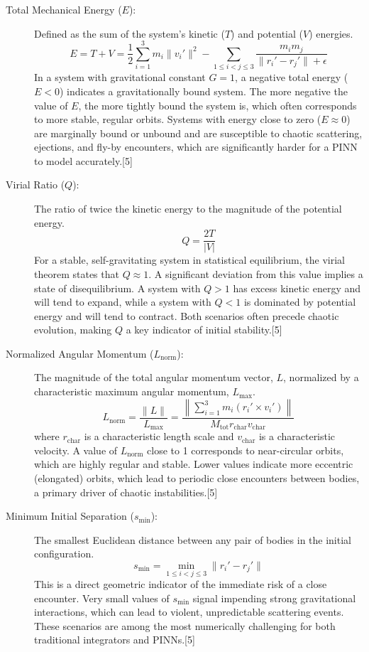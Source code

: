 \begin{description}
    \item[Total Mechanical Energy ($E$):] Defined as the sum of the system's kinetic ($T$) and potential ($V$) energies.
    $$E = T + V = \frac{1}{2}\sum_{i=1}^{3}m_{i}\lVert v_{i}'\rVert^{2} - \sum_{1\le i<j\le3}\frac{m_{i}m_{j}}{\lVert r_{i}'-r_{j}'\rVert+\epsilon}$$
    In a system with gravitational constant $G=1$, a negative total energy ($E < 0$) indicates a gravitationally bound system. The more negative the value of $E$, the more tightly bound the system is, which often corresponds to more stable, regular orbits. Systems with energy close to zero ($E \approx 0$) are marginally bound or unbound and are susceptible to chaotic scattering, ejections, and fly-by encounters, which are significantly harder for a PINN to model accurately.[5]

    \item[Virial Ratio ($Q$):] The ratio of twice the kinetic energy to the magnitude of the potential energy.
    $$Q = \frac{2T}{|V|}$$
    For a stable, self-gravitating system in statistical equilibrium, the virial theorem states that $Q \approx 1$. A significant deviation from this value implies a state of disequilibrium. A system with $Q > 1$ has excess kinetic energy and will tend to expand, while a system with $Q < 1$ is dominated by potential energy and will tend to contract. Both scenarios often precede chaotic evolution, making $Q$ a key indicator of initial stability.[5]

    \item[Normalized Angular Momentum ($L_{\text{norm}}$):] The magnitude of the total angular momentum vector, $L$, normalized by a characteristic maximum angular momentum, $L_{\text{max}}$.
    $$L_{\text{norm}} = \frac{\lVert L\rVert}{L_{\text{max}}} = \frac{\left\lVert\sum_{i=1}^{3}m_{i}(r_{i}'\times v_{i}')\right\rVert}{M_{\text{tot}}r_{\text{char}}v_{\text{char}}}$$
    where $r_{\text{char}}$ is a characteristic length scale and $v_{\text{char}}$ is a characteristic velocity. A value of $L_{\text{norm}}$ close to 1 corresponds to near-circular orbits, which are highly regular and stable. Lower values indicate more eccentric (elongated) orbits, which lead to periodic close encounters between bodies, a primary driver of chaotic instabilities.[5]

    \item[Minimum Initial Separation ($s_{\text{min}}$):] The smallest Euclidean distance between any pair of bodies in the initial configuration.
    $$s_{\text{min}} = \min_{1\le i<j\le3}\lVert r_{i}'-r_{j}'\rVert$$
    This is a direct geometric indicator of the immediate risk of a close encounter. Very small values of $s_{\text{min}}$ signal impending strong gravitational interactions, which can lead to violent, unpredictable scattering events. These scenarios are among the most numerically challenging for both traditional integrators and PINNs.[5]


\end{description}
